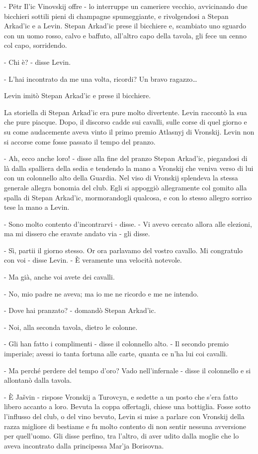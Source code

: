 - Pëtr Il'ic Vinovskij offre - lo interruppe un cameriere vecchio, avvicinando due bicchieri sottili pieni di champagne spumeggiante, e rivolgendosi a Stepan Arkad'ic e a Levin. Stepan Arkad'ic prese il bicchiere e, scambiato uno sguardo con un uomo rosso, calvo e baffuto, all'altro capo della tavola, gli fece un cenno col capo, sorridendo. 

- Chi è? - disse Levin. 

- L'hai incontrato da me una volta, ricordi? Un bravo ragazzo\ldots{} 

Levin imitò Stepan Arkad'ic e prese il bicchiere. 

La storiella di Stepan Arkad'ic era pure molto divertente. Levin raccontò la sua che pure piacque. Dopo, il discorso cadde sui cavalli, sulle corse di quel giorno e su come audacemente aveva vinto il primo premio Atlasnyj di Vronskij. Levin non si accorse come fosse passato il tempo del pranzo. 

- Ah, ecco anche loro! - disse alla fine del pranzo Stepan Arkad'ic, piegandosi di là dalla spalliera della sedia e tendendo la mano a Vronskij che veniva verso di lui con un colonnello alto della Guardia. Nel viso di Vronskij splendeva la stessa generale allegra bonomia del club. Egli si appoggiò allegramente col gomito alla spalla di Stepan Arkad'ic, mormorandogli qualcosa, e con lo stesso allegro sorriso tese la mano a Levin. 

- Sono molto contento d'incontrarvi - disse. - Vi avevo cercato allora alle elezioni, ma mi dissero che eravate andato via - gli disse. 

- Sì, partii il giorno stesso. Or ora parlavamo del vostro cavallo. Mi congratulo con voi - disse Levin. - È veramente una velocità notevole. 

- Ma già, anche voi avete dei cavalli. 

- No, mio padre ne aveva; ma io me ne ricordo e me ne intendo. 

- Dove hai pranzato? - domandò Stepan Arkad'ic. 

- Noi, alla seconda tavola, dietro le colonne. 

- Gli han fatto i complimenti - disse il colonnello alto. - Il secondo premio imperiale; avessi io tanta fortuna alle carte, quanta ce n'ha lui coi cavalli. 

- Ma perché perdere del tempo d'oro? Vado nell'infernale - disse il colonnello e si allontanò dalla tavola. 

- È Jašvin - rispose Vronskij a Turovcyn, e sedette a un posto che s'era fatto libero accanto a loro. Bevuta la coppa offertagli, chiese una bottiglia. Fosse sotto l'influsso del club, o del vino bevuto, Levin si mise a parlare con Vronskij della razza migliore di bestiame e fu molto contento di non sentir nessuna avversione per quell'uomo. Gli disse perfino, tra l'altro, di aver udito dalla moglie che lo aveva incontrato dalla principessa Mar'ja Borisovna. 

